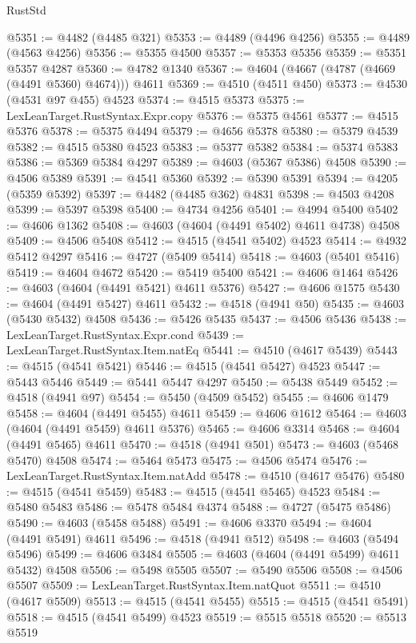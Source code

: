 \begin{lexlean}{RustStd}
\begin{coremodule}
@5351 := @4482 (@4485 @321)
@5353 := @4489 (@4496 @4256)
@5355 := @4489 (@4563 @4256)
@5356 := @5355 @4500
@5357 := @5353 @5356
@5359 := @5351 @5357 @4287
@5360 := @4782 @1340
@5367 := @4604 (@4667 (@4787 (@4669 (@4491 @5360) @4674))) @4611
@5369 := @4510 (@4511 @450)
@5373 := @4530 (@4531 @97 @455) @4523
@5374 := @4515 @5373
@5375 := LexLeanTarget.RustSyntax.Expr.copy
@5376 := @5375 @4561
@5377 := @4515 @5376
@5378 := @5375 @4494
@5379 := @4656 @5378
@5380 := @5379 @4539
@5382 := @4515 @5380 @4523
@5383 := @5377 @5382
@5384 := @5374 @5383
@5386 := @5369 @5384 @4297
@5389 := @4603 (@5367 @5386) @4508
@5390 := @4506 @5389
@5391 := @4541 @5360
@5392 := @5390 @5391
@5394 := @4205 (@5359 @5392)
@5397 := @4482 (@4485 @362) @4831
@5398 := @4503 @4208
@5399 := @5397 @5398
@5400 := @4734 @4256
@5401 := @4994 @5400
@5402 := @4606 @1362
@5408 := @4603 (@4604 (@4491 @5402) @4611 @4738) @4508
@5409 := @4506 @5408
@5412 := @4515 (@4541 @5402) @4523
@5414 := @4932 @5412 @4297
@5416 := @4727 (@5409 @5414)
@5418 := @4603 (@5401 @5416)
@5419 := @4604 @4672
@5420 := @5419 @5400
@5421 := @4606 @1464
@5426 := @4603 (@4604 (@4491 @5421) @4611 @5376)
@5427 := @4606 @1575
@5430 := @4604 (@4491 @5427) @4611
@5432 := @4518 (@4941 @50)
@5435 := @4603 (@5430 @5432) @4508
@5436 := @5426 @5435
@5437 := @4506 @5436
@5438 := LexLeanTarget.RustSyntax.Expr.cond
@5439 := LexLeanTarget.RustSyntax.Item.natEq
@5441 := @4510 (@4617 @5439)
@5443 := @4515 (@4541 @5421)
@5446 := @4515 (@4541 @5427) @4523
@5447 := @5443 @5446
@5449 := @5441 @5447 @4297
@5450 := @5438 @5449
@5452 := @4518 (@4941 @97)
@5454 := @5450 (@4509 @5452)
@5455 := @4606 @1479
@5458 := @4604 (@4491 @5455) @4611
@5459 := @4606 @1612
@5464 := @4603 (@4604 (@4491 @5459) @4611 @5376)
@5465 := @4606 @3314
@5468 := @4604 (@4491 @5465) @4611
@5470 := @4518 (@4941 @501)
@5473 := @4603 (@5468 @5470) @4508
@5474 := @5464 @5473
@5475 := @4506 @5474
@5476 := LexLeanTarget.RustSyntax.Item.natAdd
@5478 := @4510 (@4617 @5476)
@5480 := @4515 (@4541 @5459)
@5483 := @4515 (@4541 @5465) @4523
@5484 := @5480 @5483
@5486 := @5478 @5484 @4374
@5488 := @4727 (@5475 @5486)
@5490 := @4603 (@5458 @5488)
@5491 := @4606 @3370
@5494 := @4604 (@4491 @5491) @4611
@5496 := @4518 (@4941 @512)
@5498 := @4603 (@5494 @5496)
@5499 := @4606 @3484
@5505 := @4603 (@4604 (@4491 @5499) @4611 @5432) @4508
@5506 := @5498 @5505
@5507 := @5490 @5506
@5508 := @4506 @5507
@5509 := LexLeanTarget.RustSyntax.Item.natQuot
@5511 := @4510 (@4617 @5509)
@5513 := @4515 (@4541 @5455)
@5515 := @4515 (@4541 @5491)
@5518 := @4515 (@4541 @5499) @4523
@5519 := @5515 @5518
@5520 := @5513 @5519

\end{coremodule}
\end{lexlean}
